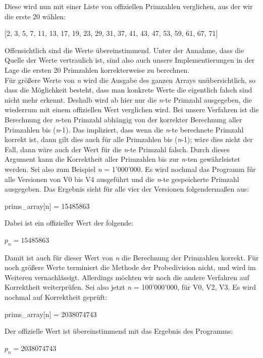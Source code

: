 \documentclass[course=erap]{aspdoc}
\begin{document}
Diese wird nun mit einer Liste von offiziellen Primzahlen verglichen, aus der wir die erste 20 wählen:
 \begin{center} [2, 3, 5, 7, 11, 13, 17, 19, 23, 29, 31, 37, 41, 43, 47, 53, 59, 61, 67, 71]\end{center} \begin{flushright}\cite[PrimesUtmEdu]{utmPrimes} \end{flushright}
 Offensichtlich sind die Werte übereinstimmend. Unter der Annahme, dass die Quelle der Werte vertraulich ist, sind also auch unsere Implementierungen in der Lage die ersten 20 Primzahlen korrekterweise zu berechnen. \\
 Für größere Werte von \textit{n} wird die Ausgabe des ganzen Arrays unübersichtlich, so dass die Möglichkeit besteht, dass man konkrete Werte die eigentlich falsch sind nicht mehr erkennt. Deshalb wird ab hier nur die \textit{n}-te Primzahl ausgegeben, die wiederrum mit einem offiziellen Wert verglichen wird. Bei unsere Verfahren ist die Berechnung der \textit{n}-ten Primzahl abhängig von der korrekter Berechnung aller Primzahlen bis (\textit{n}-1). Das impliziert, dass wenn die \textit{n}-te berechnete Primzahl korrekt ist, dann gilt dies auch für alle Primzahlen bis (\textit{n}-1); wäre dies nicht der Fall, dann wäre auch der Wert für die \textit{n}-te Primzahl falsch. Durch dieses Argument kann die Korrektheit aller Primzahlen bis zur \textit{n}-ten gewährleistet werden. Sei also zum Beispiel \textit{n} = 1'000'000. Es wird nochmal das Programm für alle Versionen von V0 bis V4 ausgeführt und die \textit{n}-te gespeicherte Primzahl ausgegeben. Das Ergebnis sieht für alle vier der Versionen folgendermaßen aus: \begin{center} prims\_array[n] = 15485863 \end{center}
 Dabei ist ein offizieller Wert der folgende: \begin{center} $p_n = 15485863$ \end{center}
 \begin{flushright}\cite[WolframAlpha]{wAlpha1} \end{flushright}
 Damit ist auch für dieser Wert von \textit{n} die Berechnung der Primzahlen korrekt. Für noch größere Werte terminiert die Methode der Probedivision nicht, und wird im Weiteren vernachlässigt. Allerdings möchten wir noch die andere Verfahren auf Korrektheit weiterprüfen. Sei also jetzt \textit{n} = 100'000'000, für V0, V2, V3. Es wird nochmal auf Korrektheit geprüft: \begin{center} prims\_array[n] = 2038074743 \end{center} Der offizielle Wert ist übereinstimmend mit das Ergebnis des Programms: \begin{center} $p_n = 2038074743 $ \end{center}
\end{document}
